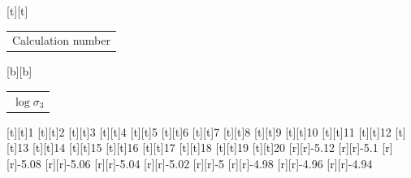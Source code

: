 %    
%
%
\begin{psfrags}%
\psfragscanon%
%
[t][t]{\color[rgb]{0,0,0}\setlength{\tabcolsep}{0pt}\begin{tabular}{c}{\Large{}Calculation number}\end{tabular}}%
[b][b]{\color[rgb]{0,0,0}\setlength{\tabcolsep}{0pt}\begin{tabular}{c}{\Large$\log \sigma_3$}\end{tabular}}%
%
[t][t]{1}%
[t][t]{2}%
[t][t]{3}%
[t][t]{4}%
[t][t]{5}%
[t][t]{6}%
[t][t]{7}%
[t][t]{8}%
[t][t]{9}%
[t][t]{10}%
[t][t]{11}%
[t][t]{12}%
[t][t]{13}%
[t][t]{14}%
[t][t]{15}%
[t][t]{16}%
[t][t]{17}%
[t][t]{18}%
[t][t]{19}%
[t][t]{20}%
%
[r][r]{-5.12}%
[r][r]{-5.1}%
[r][r]{-5.08}%
[r][r]{-5.06}%
[r][r]{-5.04}%
[r][r]{-5.02}%
[r][r]{-5}%
[r][r]{-4.98}%
[r][r]{-4.96}%
[r][r]{-4.94}%
%
%
\end{psfrags}%
%
